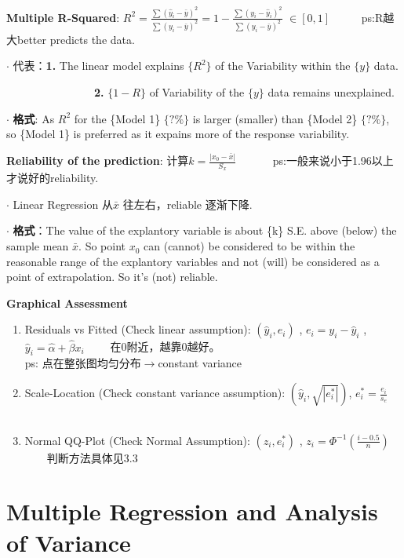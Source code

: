 \documentclass[9pt]{article}
\begin{document}
    \textbf{Multiple R-Squared}: $R^2=\frac{\sum(\hat{y}_i-\bar{y})^2}{\sum(y_i-\bar{y})^2}=1-\frac{\sum(y_i-\hat{y}_i)^2}{\sum(y_i-\bar{y})^2}$ $\in [0,1]$ \ \ \ \ \ ps:R越大better predicts the data.

$\cdot$ 代表：\textbf{1.} The linear model explains $\{R^2\}$ of the Variability within the $\{y\}$ data.

    \ \ \ \ \ \ \ \ \ \ \ \ \ \ \ \ \textbf{2.} $\{1-R\}$ of Variability of the $\{y\}$ data remains unexplained.

$\cdot$ \textbf{格式}: As $R^2$ for the \{Model 1\} $\{?\%\}$ is larger (smaller) than \{Model 2\} $\{?\%\}$, so \{Model 1\} is preferred as it expains more of the response variability.

    \textbf{Reliability of the prediction}: 计算$k=\frac{|x_0-\bar{x}|}{S_x}$ \ \ \ \ \ \ ps:一般来说小于1.96以上才说好的reliability.

$\cdot$ Linear Regression 从$\bar{x}$ 往左右，reliable 逐渐下降.

$\cdot$ \textbf{格式}：The value of the explantory variable is about \{k\} S.E. above (below) the sample mean $\bar{x}$. So point $x_0$ can (cannot) be considered to be within the reasonable range of the explantory variables and not (will) be considered as a point of extrapolation. So it's (not) reliable.

    \textbf{Graphical Assessment}
    \begin{enumerate}[itemsep=-2pt, topsep=-2pt]
        \item Residuals vs Fitted (Check linear assumption): $(\hat{y}_i,e_i)$ , $e_i=y_i-\hat{y}_i$ , $\hat{y}_i=\hat{\alpha}+\hat{\beta}x_i$ \ \ \ \ 在0附近，越靠0越好。
              \\ ps: 点在整张图均匀分布$\to$constant variance 
        \item Scale-Location (Check constant variance assumption): $(\hat{y}_i,\sqrt{|e^*_i|})$, $e^*_i=\frac{e_i}{s_e}$ \ \ \ \ 
        \item Normal QQ-Plot (Check Normal Assumption): $(z_i,e^*_i)$ , $z_i=\Phi^{-1}(\frac{i-0.5}{n})$ \ \ \ \ 判断方法具体见3.3
    \end{enumerate}

    \section{Multiple Regression and Analysis of Variance} %
\end{document}
